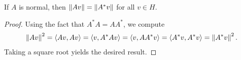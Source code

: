 \begin{proposition}
If $A$ is normal, then $\left\|Av\right\| = \left\|A^*v\right\|$ for all $v \in H$.
\end{proposition}

\begin{proof}
Using the fact that $A^*A = AA^*$, we compute
\begin{align*}
\left\|Av\right\|^2 = \langle Av, Av \rangle = \langle v, A^*Av \rangle = \langle v, AA^*v \rangle = \langle A^*v, A^*v \rangle = \left\|A^*v\right\|^2.
\end{align*}
Taking a square root yields the desired result.
\end{proof}
